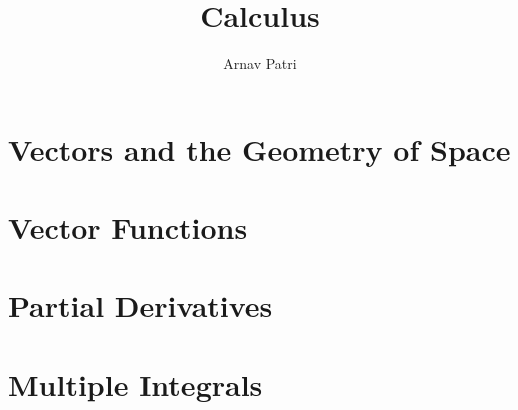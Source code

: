 \documentclass[12pt, A4]{report}
\title{Calculus \Roman{3}}
\author{Arnav Patri}
\begin{document}
	\maketitle
	\tableofcontents
	\setcounter{chapter}{11}
		\chapter{Vectors and the Geometry of Space}
			
		\chapter{Vector Functions}
			
		\chapter{Partial Derivatives}
			
		\chapter{Multiple Integrals}
			
\end{document}

